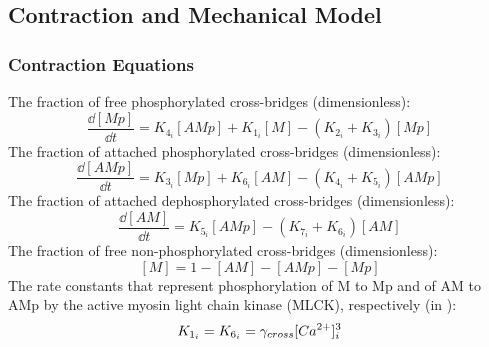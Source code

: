 \subsection{Contraction and Mechanical Model}

\subsubsection{Contraction Equations}
%
The fraction of free phosphorylated cross-bridges (dimensionless):
\begin{equation} \label{eq:dMpdt}
\frac{\dd[Mp]}{\dd t} = K_{4_{i}}[AMp] +K_{1_{i}} [M] - ( K_{2_{i}} + K_{3_{i}} ) [Mp]
\end{equation}
%
The fraction of attached phosphorylated cross-bridges (dimensionless):
\begin{equation} \label{eq:dAMpdt}
\frac{\dd[AMp]}{\dd t} =K_{3_{i}} [Mp] + K_{6_{i}} [AM] - ( K_{4_{i}} + K_{5_{i}} )[AMp]
\end{equation} 
%
The fraction of attached dephosphorylated cross-bridges (dimensionless):
\begin{equation} \label{eq:dAMdt}
\frac{\dd[AM]}{\dd t} = K_{5_{i}} [AMp]-(K_{7_{i}}+K_{6_{i}})[AM]
\end{equation}
%
The fraction of free non-phosphorylated cross-bridges (dimensionless):
\begin{equation} \label{eq:dMdt}
[M]=1-[AM]-[AMp]-[Mp]
\end{equation}
%
The rate constants that represent phosphorylation of M to Mp and of AM to AMp by the active myosin light chain kinase (MLCK), respectively (in \pers):
\begin{equation} \label{eq:gamma}
K_{1_{i}} = K_{6_{i}} = \gamma_{cross} [Ca^{2+}]_{i} ^{3}
\end{equation}
%
%
